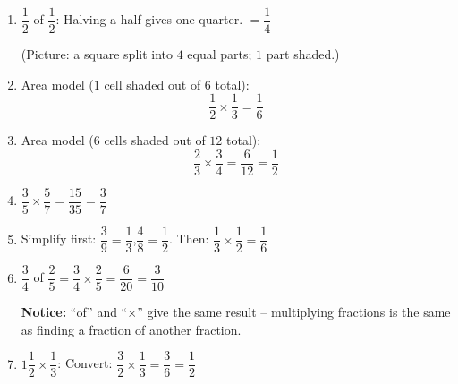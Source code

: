 \documentclass{beamer}
\begin{document}
\begin{frame}
\small
\begin{enumerate}

  \item $\dfrac{1}{2}$ of $\dfrac{1}{2}$: Halving a half gives one quarter. \quad $= \dfrac{1}{4}$

  \vspace{0.2em}
  (Picture: a square split into $4$ equal parts; $1$ part shaded.)

  \item Area model ($1$ cell shaded out of $6$ total):
  \[
    \frac{1}{2} \times \frac{1}{3} = \frac{1}{6}
  \]

  \item Area model ($6$ cells shaded out of $12$ total):
  \[
    \frac{2}{3} \times \frac{3}{4} = \frac{6}{12} = \frac{1}{2}
  \]

  \item $\dfrac{3}{5} \times \dfrac{5}{7} = \dfrac{15}{35} = \dfrac{3}{7}$

  \item Simplify first: $\dfrac{3}{9} = \dfrac{1}{3}$,\quad $\dfrac{4}{8} = \dfrac{1}{2}$.
  Then: $\dfrac{1}{3} \times \dfrac{1}{2} = \dfrac{1}{6}$

  \item $\dfrac{3}{4}$ of $\dfrac{2}{5} = \dfrac{3}{4} \times \dfrac{2}{5} = \dfrac{6}{20} = \dfrac{3}{10}$

  \textbf{Notice:} ``of'' and ``$\times$'' give the same result -- multiplying fractions is the same as finding a fraction of another fraction.

  \item $1\dfrac{1}{2} \times \dfrac{1}{3}$: Convert: $\dfrac{3}{2} \times \dfrac{1}{3} = \dfrac{3}{6} = \dfrac{1}{2}$

\end{enumerate}
\end{frame}
\end{document}
